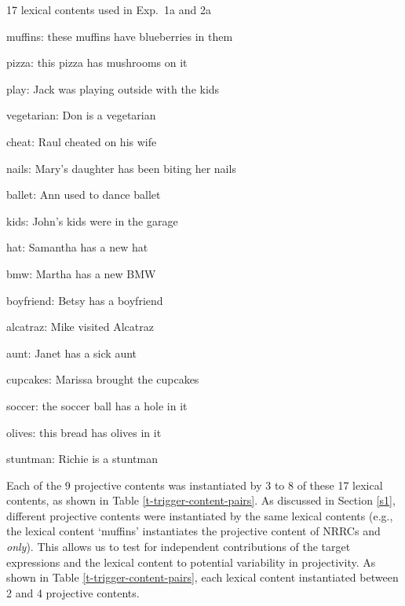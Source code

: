 \documentclass[11pt,fleqn]{article}
\newcommand{\6}{\mbox{$[\hspace*{-.6mm}[$}}
\newcommand{\9}{\mbox{$]\hspace*{-.6mm}]$}}
\newcommand{\tableref}[1]{Table \ref{#1}}
\newcommand{\sectionref}[1]{Section \ref{#1}}
\begin{document}
\begin{exe}
\ex\label{contents} 17 lexical contents used in Exp.~1a and 2a

\begin{enumerate}[itemsep=-.5mm]

\ex muffins: these muffins have blueberries in them

\ex pizza: this pizza has mushrooms on it

\ex play: Jack was playing outside with the kids

\ex vegetarian: Don is a vegetarian

\ex cheat: Raul cheated on his wife

\ex nails: Mary's daughter has been biting her nails

\ex ballet: Ann used to dance ballet

\ex kids: John's kids were in the garage

\ex hat: Samantha has a new hat

\ex bmw: Martha has a new BMW

\ex boyfriend: Betsy has a boyfriend

\ex alcatraz: Mike visited Alcatraz

\ex aunt: Janet has a sick aunt

\ex cupcakes: Marissa brought the cupcakes

\ex soccer: the soccer ball has a hole in it

\ex olives: this bread has olives in it

\ex stuntman: Richie is a stuntman

\end{enumerate}
\end{exe}

Each of the 9 projective contents was instantiated by 3 to 8 of these 17 lexical contents, as shown in \tableref{t-trigger-content-pairs}. As discussed in \sectionref{s1}, different projective contents were instantiated by the same lexical contents (e.g., the lexical content `muffins' instantiates the projective content of NRRCs and {\em only}). This allows us to test for independent contributions of the target expressions and the lexical content to potential variability in projectivity. As shown in \tableref{t-trigger-content-pairs}, each lexical content instantiated between 2 and 4 projective contents.
\end{document}
